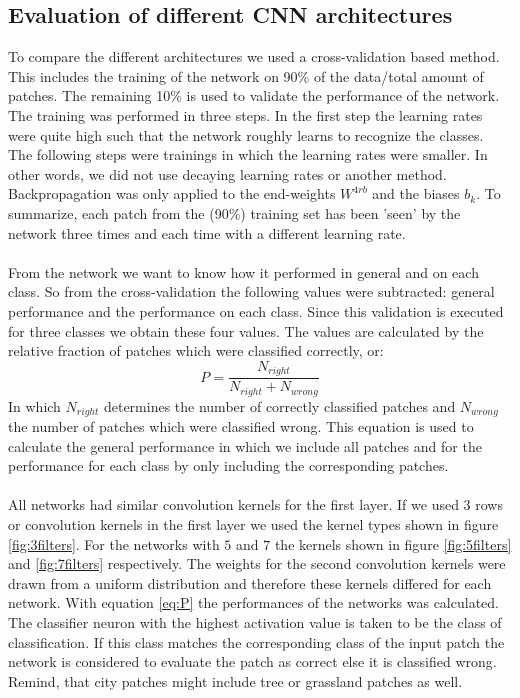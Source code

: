 \documentclass[a4paper,onecolumn]{report}
\begin{document}
\begin{appendices}
	
\chapter{Evaluation of different CNN architectures}
\label{app:DiffentArchitectures}
To compare the different architectures we used a cross-validation based method. This includes the training of the network on 90\% of the data/total amount of patches. The remaining 10\% is used to validate the performance of the network. The training was performed in three steps. In the first step the learning rates were quite high such that the network roughly learns to recognize the classes. The following steps were trainings in which the learning rates were smaller. In other words, we did not use decaying learning rates or another method. Backpropagation  was only applied to the end-weights $W^{4rb}$ and the biases $b_{k}$. To summarize, each patch from the (90\%) training set  has been 'seen' by the network three times and each time with a different learning rate. 
\\\\
From the network we want to know how it performed in general and on each class. So from the cross-validation the following values were subtracted: general performance and the performance on each class. Since this validation is executed for three classes we obtain these four values. The values are calculated by the relative fraction of patches which were classified correctly, or:
\begin{equation}
\label{eq:P}
P= \frac{N_{right}}{N_{right}+ N_{wrong}}
\end{equation}
In which $N_{right}$ determines the number of correctly classified patches and $N_{wrong}$ the number of patches which were classified wrong. This equation is used to calculate the general performance in which we include all patches and for the performance for each class by only including the corresponding patches.
\\\\
All networks had similar convolution kernels for the first layer. If we used $3$ rows or convolution kernels in the first layer we used the kernel types shown in figure \ref{fig:3filters}. For the networks with $5$ and $7$ the kernels shown in figure \ref{fig:5filters} and \ref{fig:7filters} respectively. The weights for the second convolution kernels were drawn from a uniform distribution and therefore these kernels differed for each network. With equation \ref{eq:P} the performances of the networks was calculated. The classifier neuron with the highest activation value is taken to be the class of classification. If this class matches the corresponding class of the input patch the network is considered to evaluate the patch as correct else it is classified wrong. Remind, that city patches might include tree or grassland patches as well.


\end{appendices}
\end{document}
